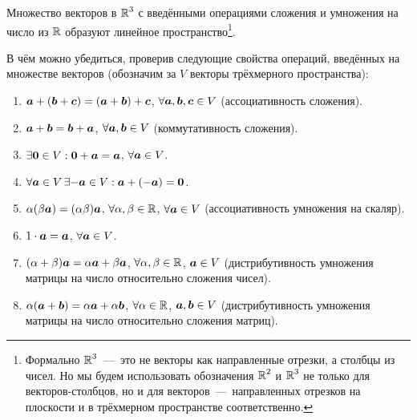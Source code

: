 \documentclass[a4paper,12pt]{article}
\begin{document}
  Множество векторов в $\operatorname{\mathbb R}^3$ с введёнными операциями сложения и умножения на число из $\operatorname{\mathbb R}$ образуют линейное пространство\footnote{Формально $\operatorname{\mathbb R}^3$~---~это не векторы как направленные отрезки, а столбцы из чисел. Но мы будем использовать обозначения $\operatorname{\mathbb R}^2$ и $\operatorname{\mathbb R}^3$ не только для векторов-столбцов, но и для векторов~---~направленных отрезков на плоскости и в трёхмерном пространстве соответственно.}.
  
  \begin{remark}
    В чём можно убедиться, проверив следующие свойства операций, введённых на множестве векторов (обозначим за $V$ векторы трёхмерного пространства):
    \begin{enumerate}
      \item $\boldsymbol a + (\boldsymbol b + \boldsymbol c) = (\boldsymbol a + \boldsymbol b) + \boldsymbol c$, $\forall \boldsymbol a, \boldsymbol b, \boldsymbol c \in V$ (ассоциативность сложения).
      \item $\boldsymbol a + \boldsymbol b = \boldsymbol b + \boldsymbol a$, $\forall \boldsymbol a, \boldsymbol b \in V$ (коммутативность сложения).
      \item $\exists \boldsymbol 0 \in V: \boldsymbol 0 + \boldsymbol a = \boldsymbol a$, $\forall \bds a \hm\in V$.
      \item $\forall \boldsymbol a \in V\, \exists {-\boldsymbol a} \in V: \boldsymbol a + ({-\boldsymbol a}) = \boldsymbol 0$.
      \item $\alpha (\beta \boldsymbol a) = (\alpha \beta) \boldsymbol a$, $\forall \alpha, \beta \in \operatorname{\mathbb R}$, $\forall \bds a \hm\in V$ (ассоциативность умножения на скаляр).
      \item $1 \cdot \boldsymbol a = \boldsymbol a$, $\forall \boldsymbol a \in V$.
      \item $(\alpha + \beta) \boldsymbol a = \alpha \boldsymbol a + \beta \boldsymbol a$, $\forall \alpha, \beta \hm\in \RR$, $\bds a \hm\in V$ (дистрибутивность умножения матрицы на число относительно сложения чисел).
      \item $\alpha (\boldsymbol a + \boldsymbol b) = \alpha \boldsymbol a + \alpha \boldsymbol b$, $\forall \alpha \hm\in \RR$, $\bds a, \bds b \hm\in V$ (дистрибутивность умножения матрицы на число относительно сложения матриц).
    \end{enumerate}
  \end{remark}
  
\end{document}
